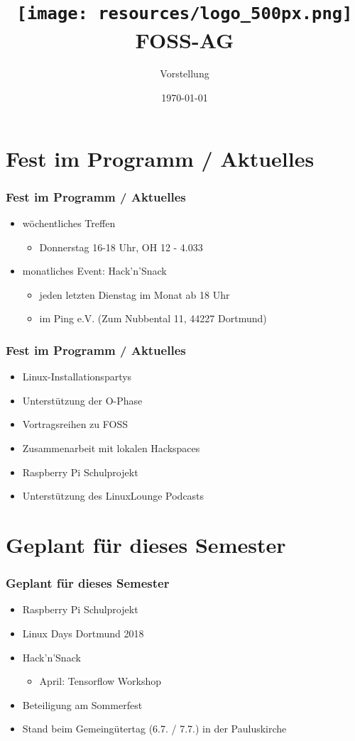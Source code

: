 \documentclass[12pt,utf8]{beamer}
\title{
	\hspace*{8cm}
	\texttt{[image: resources/logo\_500px.png]}
	\newline
	FOSS-AG
}
\subtitle{Vorstellung}
\institute[FOSS AG]{\textbf{F}ree and \textbf{O}pen \textbf{S}ource \textbf{S}oftware \textbf{AG}}
\date{\today}
\begin{document}
	\begin{frame}
		\titlepage
	\end{frame}

\section{Fest im Programm / Aktuelles}
	\begin{frame}
		\frametitle{Fest im Programm / Aktuelles}
		\begin{itemize}
			\item wöchentliches Treffen
			\begin{itemize}
				\item Donnerstag 16-18 Uhr, OH 12 - 4.033
			\end{itemize}
			\item monatliches Event: Hack'n'Snack
			\begin{itemize}
				\item jeden letzten Dienstag im Monat ab 18 Uhr
				\item im Ping e.V. (Zum Nubbental 11, 44227 Dortmund)
			\end{itemize}
		\end{itemize}
	\end{frame}

	\begin{frame}
		\frametitle{Fest im Programm / Aktuelles}
		\begin{itemize}
			\item Linux-Installationspartys
			\item Unterstützung der O-Phase
			\item Vortragsreihen zu FOSS
			\item Zusammenarbeit mit lokalen Hackspaces
			\item Raspberry Pi Schulprojekt
			\item Unterstützung des LinuxLounge Podcasts
		\end{itemize}
	\end{frame}

\section{Geplant für dieses Semester}
	\begin{frame}
		\frametitle{Geplant für dieses Semester}
		\begin{itemize}
			\item Raspberry Pi Schulprojekt
			\item Linux Days Dortmund 2018
			\item Hack'n'Snack
				\begin{itemize}
					\item April: Tensorflow Workshop
				\end{itemize}
			\item Beteiligung am Sommerfest
			\item Stand beim Gemeingütertag (6.7. / 7.7.) in der Pauluskirche 
		\end{itemize}
	\end{frame}
\end{document}
